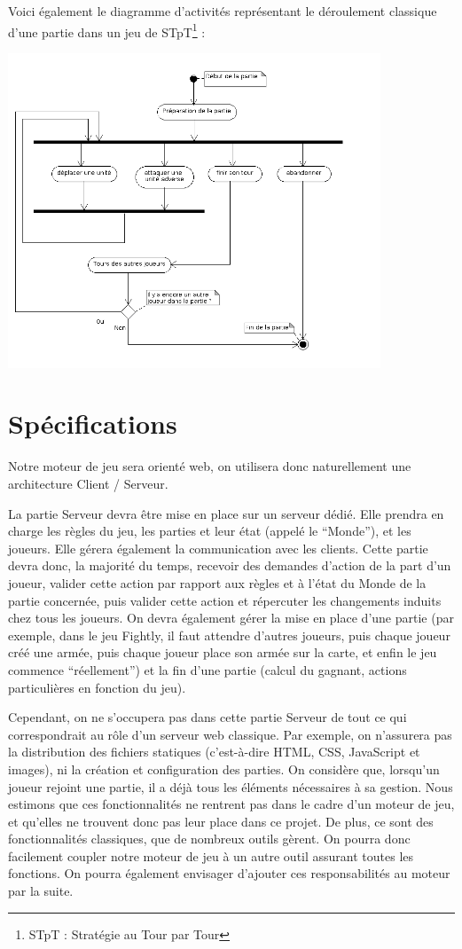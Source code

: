 \documentclass[a4paper,10pt]{report}
\begin{document}
      Voici également le diagramme d'activités représentant le déroulement classique d'une partie dans un jeu de STpT\footnote{STpT : Stratégie au Tour par Tour} : 
      
      \includegraphics[width=420px]{diagrammes/moteuractivites.png}



    \section{Spécifications}

      Notre moteur de jeu sera orienté web, on utilisera donc naturellement une architecture Client / Serveur. 

      La partie Serveur devra être mise en place sur un serveur dédié. Elle prendra en charge les règles du jeu, les parties et leur état (appelé le ``Monde''), et les joueurs. Elle gérera également la communication avec les clients. Cette partie devra donc, la majorité du temps, recevoir des demandes d'action de la part d'un joueur, valider cette action par rapport aux règles et à l'état du Monde de la partie concernée, puis valider cette action et répercuter les changements induits chez tous les joueurs. On devra également gérer la mise en place d'une partie (par exemple, dans le jeu Fightly, il faut attendre d'autres joueurs, puis chaque joueur créé une armée, puis chaque joueur place son armée sur la carte, et enfin le jeu commence ``réellement'') et la fin d'une partie (calcul du gagnant, actions particulières en fonction du jeu). 
      
      Cependant, on ne s'occupera pas dans cette partie Serveur de tout ce qui correspondrait au rôle d'un serveur web classique. Par exemple, on n'assurera pas la distribution des fichiers statiques (c'est-à-dire HTML, CSS, JavaScript et images), ni la création et configuration des parties. On considère que, lorsqu'un joueur rejoint une partie, il a déjà tous les éléments nécessaires à sa gestion. Nous estimons que ces fonctionnalités ne rentrent pas dans le cadre d'un moteur de jeu, et qu'elles ne trouvent donc pas leur place dans ce projet. De plus, ce sont des fonctionnalités classiques, que de nombreux outils gèrent. On pourra donc facilement coupler notre moteur de jeu à un autre outil assurant toutes les fonctions. On pourra également envisager d'ajouter ces responsabilités au moteur par la suite. 
\end{document}
